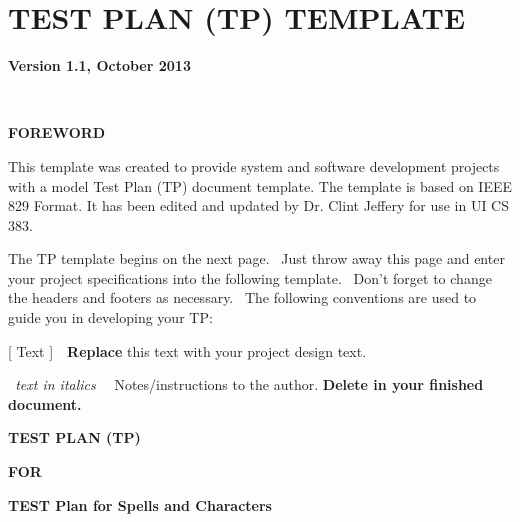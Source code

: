 \chapter{TEST PLAN (TP) TEMPLATE}

{\centering{}\bfseries\color{black}
Version 1.1, October 2013
\par}

\ 

{\centering{}\bfseries\color{black}
FOREWORD
\par}

{\color{black}
This template was created to provide system and software development
projects with a model Test Plan (TP) document template.
The template is based on IEEE 829 Format.
It has been edited and updated by
Dr. Clint Jeffery for use in UI CS 383.}

{\color{black}
The TP template begins on the next page. \ Just throw away this page
and enter your project specifications into the following template.
\ Don{\textquoteright}t forget to change the headers and footers as
necessary. \ The following conventions are used to guide you in
developing your TP:}

{\color{black}
\foreignlanguage{english}{[ Text
]\ \ }\foreignlanguage{english}{\textbf{Replace}}\foreignlanguage{english}{
this text with your project design text.}}

{\color{black}
\foreignlanguage{english}{\textit{\ }}\foreignlanguage{english}{\textit{text
in italics }}\foreignlanguage{english}{\ \ Notes/instructions to the
author. }\foreignlanguage{english}{\textbf{Delete in your finished
document.}}}


\bigskip

{\centering\bfseries\color{black}
TEST PLAN (TP)}

{\centering{}\bfseries\color{black}
FOR
\par}


\bigskip

{\centering{}\bfseries\color{black}
TEST Plan for Spells and Characters
\par}


\bigskip


\bigskip


\bigskip

\begin{figure}
\centering
\end{figure}

